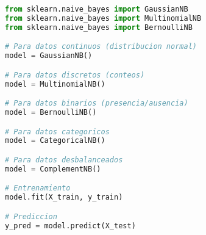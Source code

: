 \documentclass[12pt]{article}
\begin{document}
\begin{lstlisting}[language=Python]
from sklearn.naive_bayes import GaussianNB
from sklearn.naive_bayes import MultinomialNB
from sklearn.naive_bayes import BernoulliNB

# Para datos continuos (distribucion normal)
model = GaussianNB()

# Para datos discretos (conteos)
model = MultinomialNB()

# Para datos binarios (presencia/ausencia)
model = BernoulliNB()

# Para datos categoricos
model = CategoricalNB()

# Para datos desbalanceados
model = ComplementNB()

# Entrenamiento
model.fit(X_train, y_train)

# Prediccion
y_pred = model.predict(X_test)
\end{lstlisting}
\end{document}
